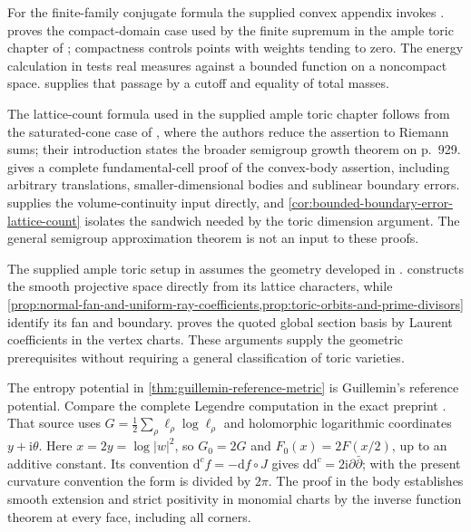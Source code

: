 For the finite-family conjugate formula the supplied convex appendix invokes \cite[Theorem 16.5]{Roc70}.  proves the compact-domain case used by the finite supremum in the ample toric chapter of \cite[Proposition \texttt{toricseq}]{XiaSampleBook}; compactness controls points with weights tending to zero. The energy calculation in \cite[Proposition \texttt{Etoric}, Step 1]{XiaSampleBook} tests real measures against a bounded function on a noncompact space.  supplies that passage by a cutoff and equality of total masses.

The lattice-count formula used in the supplied ample toric chapter follows from the saturated-cone case of \cite[Theorem 1.15, p.~939]{KK12}, where the authors reduce the assertion to Riemann sums; their introduction states the broader semigroup growth theorem on p.~929.  gives a complete fundamental-cell proof of the convex-body assertion, including arbitrary translations, smaller-dimensional bodies and sublinear boundary errors.  supplies the volume-continuity input directly, and \cref{cor:bounded-boundary-error-lattice-count} isolates the sandwich needed by the toric dimension argument. The general semigroup approximation theorem is not an input to these proofs.

The supplied ample toric setup in \cite{XiaSampleBook} assumes the geometry developed in \cite{CLS11}.  constructs the smooth projective space directly from its lattice characters, while \cref{prop:normal-fan-and-uniform-ray-coefficients,prop:toric-orbits-and-prime-divisors} identify its fan and boundary.  proves the quoted global section basis by Laurent coefficients in the vertex charts. These arguments supply the geometric prerequisites without requiring a general classification of toric varieties.

The entropy potential in \cref{thm:guillemin-reference-metric} is Guillemin's reference potential. Compare the complete Legendre computation in the exact preprint \cite[Proposition 2, pp.~7--8; Theorem 1, pp.~9--10]{CDG03v1}. That source uses $G=\tfrac12\sum_\rho\ell_\rho\log\ell_\rho$ and holomorphic logarithmic coordinates $y+\mathrm i\theta$. Here $x=2y=\log|w|^2$, so $G_0=2G$ and $F_0(x)=2F(x/2)$, up to an additive constant. Its convention $\mathrm d^c f=-\mathrm df\circ J$ gives $\mathrm d\mathrm d^c=2\mathrm i\partial\bar\partial$; with the present curvature convention the form is divided by $2\pi$. The proof in the body establishes smooth extension and strict positivity in monomial charts by the inverse function theorem at every face, including all corners.

